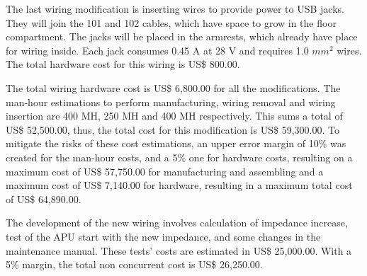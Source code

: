 The last wiring modification is inserting wires to provide power to USB jacks. They will join the 101 and 102 cables, which have space to grow in the floor compartment. The jacks will be placed in the armrests, which already have place for wiring inside. Each jack consumes 0.45 A at 28 V and requires 1.0 $mm^{2}$ wires. The total hardware cost for this wiring is US\$ 800.00.

The total wiring hardware cost is US\$ 6,800.00 for all the modifications. The man-hour estimations to perform manufacturing, wiring removal and wiring insertion are 400 MH, 250 MH and 400 MH respectively. This sums a total of US\$ 52,500.00, thus, the total cost for this modification is US\$ 59,300.00. To mitigate the risks of these cost estimations, an upper error margin of 10\% was created for the man-hour costs, and a 5\% one for hardware costs, resulting on a maximum cost of US\$ 57,750.00 for manufacturing and assembling and a maximum cost of US\$ 7,140.00 for hardware, resulting in a maximum total cost of US\$ 64,890.00.

The development of the new wiring involves calculation of impedance increase, test of the APU start with the new impedance, and some changes in the maintenance manual. These tests' costs are estimated in US\$ 25,000.00. With a 5\% margin, the total non concurrent cost is US\$ 26,250.00.
